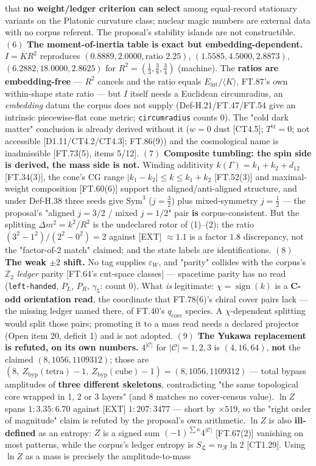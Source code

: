 \documentclass[11pt,openany]{report}
\theoremstyle{canonplain}
\theoremstyle{canondef}
\begin{document}
that \textbf{no weight/ledger criterion can select} among equal-record stationary variants on the Platonic curvature class; nuclear magic numbers are external data with no corpus referent. The proposal's stability islands are not constructible. $(6)$ \textbf{The moment-of-inertia table is exact but embedding-dependent.} $I=KR^2$ reproduces $(0.8889,2.0000,\text{ratio }2.25)$, $(1.5585,4.5000,2.8873)$, $(6.2882,18.0000,2.8625)$ for $R^2=(\tfrac13,\tfrac38,\tfrac34)$ (machine). The \textbf{ratios are embedding-free} — $R^2$ cancels and the ratio equals $E_{\mathrm{int}}/\langle K\rangle$, FT.87's own within-shape state ratio — but $I$ itself needs a Euclidean circumradius, an \textit{embedding} datum the corpus does not supply (Def-H.21/FT.47/FT.54 give an intrinsic piecewise-flat cone metric; \texttt{circumradius} counts $0$). The "cold dark matter" conclusion is already derived without it ($w=0$ dust [CT4.5]; $T^{\mathrm{tr}}=0$; not accessible [D1.11/CT4.2/CT4.3]; FT.86(9)) and the cosmological name is inadmissible [FT.73(5), items 5/12]. $(7)$ \textbf{Composite tumbling: the spin side is derived, the mass side is not.} Winding additivity $k(\Gamma)=k_1+k_2+d_{12}$ [FT.34(3)], the cone's CG range $|k_1-k_2|\le k\le k_1+k_2$ [FT.52(3)] and maximal-weight composition [FT.60(6)] support the aligned/anti-aligned structure, and under Def-H.38 three seeds give $\mathrm{Sym}^3$ ($j=\tfrac32$) plus mixed-symmetry $j=\tfrac12$ — the proposal's "aligned $j=3/2$ / mixed $j=1/2$" pair \textbf{is} corpus-consistent. But the splitting $\Delta m^2=k^2/R^2$ is the undeclared rotor of (1)–(2); the ratio $(3^2-1^2)/(2^2-0^2)=2$ against [EXT] $\approx1.1$ is a factor $1.8$ discrepancy, not the "factor-of-2 match" claimed; and the state labels are identifications. $(8)$ \textbf{The weak $\pm2$ shift.} No tag supplies $\varepsilon_W$, and "parity" collides with the corpus's $\mathbb Z_2$ \textit{ledger} parity [FT.64's cut-space classes] — spacetime parity has no read (\texttt{left-handed}, $P_L$, $P_R$, $\gamma_5$: count $0$). What \textit{is} legitimate: $\chi=\operatorname{sign}(k)$ is a \textbf{C-odd orientation read}, the coordinate that FT.78(6)'s chiral cover pairs lack — the missing ledger named there, of FT.40's $q_{\mathrm{core}}$ species. A $\chi$-dependent splitting would split those pairs; promoting it to a mass read needs a declared projector (Open item 20, deficit 1) and is not adopted. $(9)$ \textbf{The Yukawa replacement is refuted, on its own numbers.} $4^{|\mathcal C|}$ for $|\mathcal C|=1,2,3$ is $(4,16,64)$, \textbf{not} the claimed $(8,1056,1109312)$; those are $(8,\ Z_{\mathrm{byp}}(\text{tetra})-1,\ Z_{\mathrm{byp}}(\text{cube})-1)=(8,1056,1109312)$ — total bypass amplitudes of \textbf{three different skeletons}, contradicting "the same topological core wrapped in 1, 2 or 3 layers" (and $8$ matches no cover-census value). $\ln Z$ spans $1:3.35:6.70$ against [EXT] $1:207:3477$ — short by $\times519$, so the "right order of magnitude" claim is refuted by the proposal's own arithmetic. $\ln Z$ is also \textbf{ill-defined} as an entropy: $Z$ is a signed sum $(-1)^{\sum\kappa}4^{|\mathcal C|}$ [FT.67(2)] vanishing on most patterns, while the corpus's ledger entropy is $S_{\mathfrak L}=n_{\mathcal R}\ln2$ [CT1.29]. Using $\ln Z$ as a mass is precisely the amplitude-to-mass 
\end{document}
